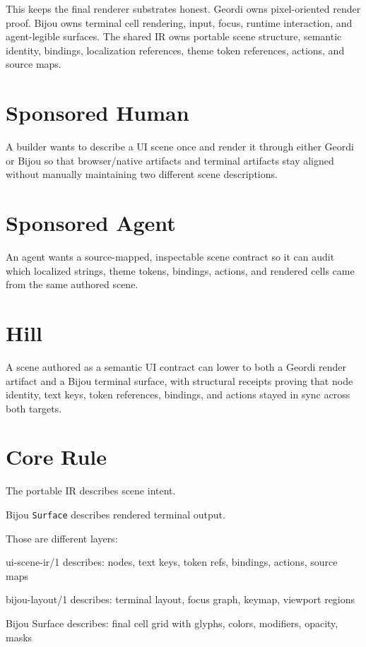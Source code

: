 

This keeps the final renderer substrates honest. Geordi owns pixel-oriented render proof. Bijou owns terminal cell rendering, input, focus, runtime interaction, and agent-legible surfaces. The shared IR owns portable scene structure, semantic identity, bindings, localization references, theme token references, actions, and source maps.

\section{Sponsored Human}\label{record-138-sponsored-human}

A builder wants to describe a UI scene once and render it through either Geordi or Bijou so that browser/native artifacts and terminal artifacts stay aligned without manually maintaining two different scene descriptions.

\section{Sponsored Agent}\label{record-138-sponsored-agent}

An agent wants a source-mapped, inspectable scene contract so it can audit which localized strings, theme tokens, bindings, actions, and rendered cells came from the same authored scene.

\section{Hill}\label{record-138-hill}

A scene authored as a semantic UI contract can lower to both a Geordi render artifact and a Bijou terminal surface, with structural receipts proving that node identity, text keys, token references, bindings, and actions stayed in sync across both targets.

\section{Core Rule}\label{record-138-core-rule}

The portable IR describes scene intent.

Bijou \texttt{S\allowbreak{}u\allowbreak{}r\allowbreak{}f\allowbreak{}a\allowbreak{}c\allowbreak{}e} describes rendered terminal output.

Those are different layers:

\begin{CodeBlock}
ui-scene-ir/1
  describes: nodes, text keys, token refs, bindings, actions, source maps

bijou-layout/1
  describes: terminal layout, focus graph, keymap, viewport regions

Bijou Surface
  describes: final cell grid with glyphs, colors, modifiers, opacity, masks
\end{CodeBlock}

